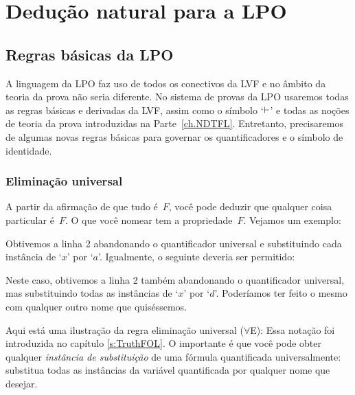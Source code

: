 \part{Dedu\c c\~ao natural para a LPO}
\label{ch.NDFOL}

\chapter{Regras b\'asicas da LPO}\label{s:BasicFOL}

A linguagem da LPO faz uso de todos os conectivos da LVF  e no \^ambito da teoria da prova n\~ao seria diferente.  No sistema de provas da LPO usaremos todas  as regras b\'asicas e derivadas da LVF,  assim como o s\'imbolo `$\vdash$' e todas as no\c c\~oes de teoria da prova introduzidas  na Parte~\ref{ch.NDTFL}.  Entretanto,  precisaremos de algumas novas regras b\'asicas para governar os quantificadores e o s\'imbolo de identidade. 

\section{Elimina\c c\~ao universal}

A partir da afirma\c c\~ao de que tudo \'e~$F$, voc\^e pode deduzir que qualquer coisa particular \'e~$F$. O que voc\^e nomear tem a propriedade~$F$.   Vejamos um exemplo:
\begin{fitchproof}
	 
\end{fitchproof}
 Obtivemos a linha 2 abandonando  o quantificador universal e substituindo cada inst\^ancia de `$x$'  por `$a$'.  Igualmente, o seguinte deveria ser permitido:
\begin{fitchproof}
	 
\end{fitchproof}

 
Neste caso, obtivemos a linha  2 tamb\'em abandonando o quantificador universal, mas substituindo todas as inst\^ancias de  `$x$' por  `$d$'. Poder\'iamos ter feito o mesmo com qualquer outro nome que quis\'essemos.

Aqui est\'a uma ilustra\c c\~ao da regra elimina\c c\~ao universal ($\forall$E):
Essa nota\c c\~ao foi introduzida no cap\'itulo \ref{s:TruthFOL}. O importante \'e que voc\^e pode obter qualquer \emph{inst\^ancia de substitui\c c\~ao} de uma f\'ormula quantificada universalmente: substitua todas as inst\^ancias da vari\'avel quantificada por qualquer nome que desejar. 

